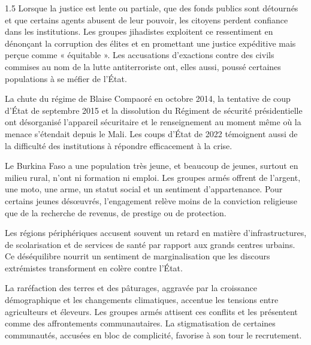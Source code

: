 \documentclass[12pt]{article}
\begin{document}
\begin{spacing}{1.5}
Lorsque la justice est lente ou partiale, que des fonds publics sont détournés et que certains agents abusent de leur pouvoir, les citoyens perdent confiance dans les institutions. Les groupes jihadistes exploitent ce ressentiment en dénonçant la corruption des élites et en promettant une justice expéditive mais perçue comme « équitable ». Les accusations d'exactions contre des civils commises au nom de la lutte antiterroriste ont, elles aussi, poussé certaines populations à se méfier de l'État.

La chute du régime de Blaise Compaoré en octobre 2014, la tentative de coup d'État de septembre 2015 et la dissolution du Régiment de sécurité présidentielle ont désorganisé l'appareil sécuritaire et le renseignement au moment même où la menace s'étendait depuis le Mali. Les coups d'État de 2022 témoignent aussi de la difficulté des institutions à répondre efficacement à la crise.



Le Burkina Faso a une population très jeune, et beaucoup de jeunes, surtout en milieu rural, n'ont ni formation ni emploi. Les groupes armés offrent de l'argent, une moto, une arme, un statut social et un sentiment d'appartenance. Pour certains jeunes désœuvrés, l'engagement relève moins de la conviction religieuse que de la recherche de revenus, de prestige ou de protection.

Les régions périphériques accusent souvent un retard en matière d'infrastructures, de scolarisation et de services de santé par rapport aux grands centres urbains. Ce déséquilibre nourrit un sentiment de marginalisation que les discours extrémistes transforment en colère contre l'État.

La raréfaction des terres et des pâturages, aggravée par la croissance démographique et les changements climatiques, accentue les tensions entre agriculteurs et éleveurs. Les groupes armés attisent ces conflits et les présentent comme des affrontements communautaires. La stigmatisation de certaines communautés, accusées en bloc de complicité, favorise à son tour le recrutement.


\end{spacing}
\end{document}
